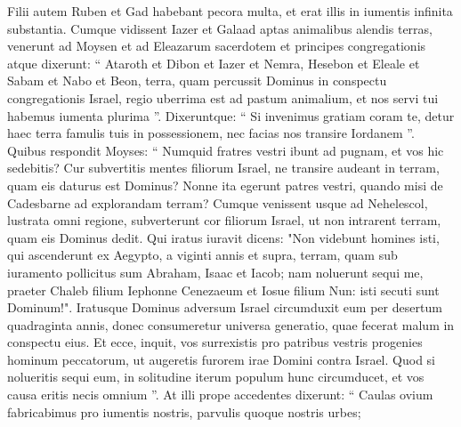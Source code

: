 \begin{biblechapter}
\begin{biblechapter}
\begin{biblechapter}
\begin{biblechapter}
\begin{biblechapter}
\begin{biblechapter}
\begin{biblechapter}
\begin{biblechapter}
\begin{biblechapter}
\begin{biblechapter}
\begin{biblechapter}
\begin{biblechapter}
\begin{biblechapter}
\begin{biblechapter}
\begin{biblechapter}
\begin{biblechapter}
\begin{biblechapter}
\begin{biblechapter}
\begin{biblechapter}
\begin{biblechapter}
\begin{biblechapter}
\begin{biblechapter}
\begin{biblechapter}
\begin{biblechapter}
\begin{biblechapter}
\begin{biblechapter}
\begin{biblechapter}
\begin{biblechapter}
\begin{biblechapter}
\begin{biblechapter}
\begin{biblechapter}
\begin{biblechapter}
\verse Filii autem Ruben et Gad habebant pecora multa, et erat illis in iumentis infinita substantia. Cumque vidissent Iazer et Galaad aptas animalibus alendis terras, 
\verse venerunt ad Moysen et ad Eleazarum sacerdotem et principes congregationis atque dixerunt: 
\verse “ Ataroth et Dibon et Iazer et Nemra, Hesebon et Eleale et Sabam et Nabo et Beon, 
\verse terra, quam percussit Dominus in conspectu congregationis Israel, regio uberrima est ad pastum animalium, et nos servi tui habemus iumenta plurima ”. 
\verse Dixeruntque: “ Si invenimus gratiam coram te, detur haec terra famulis tuis in possessionem, nec facias nos transire Iordanem ”.
 \verse Quibus respondit Moyses: “ Numquid fratres vestri ibunt ad pugnam, et vos hic sedebitis? 
\verse Cur subvertitis mentes filiorum Israel, ne transire audeant in terram, quam eis daturus est Dominus? 
\verse Nonne ita egerunt patres vestri, quando misi de Cadesbarne ad explorandam terram? 
\verse Cumque venissent usque ad Nehelescol, lustrata omni regione, subverterunt cor filiorum Israel, ut non intrarent terram, quam eis Dominus dedit. 
\verse Qui iratus iuravit dicens: 
 \verse "Non videbunt homines isti, qui ascenderunt ex Aegypto, a viginti annis et supra, terram, quam sub iuramento pollicitus sum Abraham, Isaac et Iacob; nam noluerunt sequi me, 
\verse praeter Chaleb filium Iephonne Cenezaeum et Iosue filium Nun: isti secuti sunt Dominum!". 
\verse Iratusque Dominus adversum Israel circumduxit eum per desertum quadraginta annis, donec consumeretur universa generatio, quae fecerat malum in conspectu eius. 
\verse Et ecce, inquit, vos surrexistis pro patribus vestris progenies hominum peccatorum, ut augeretis furorem irae Domini contra Israel. 
\verse Quod si nolueritis sequi eum, in solitudine iterum populum hunc circumducet, et vos causa eritis necis omnium ”.
 \verse At illi prope accedentes dixerunt: “ Caulas ovium fabricabimus pro iumentis nostris, parvulis quoque nostris urbes; 

\end{biblechapter}
\end{biblechapter}
\end{biblechapter}
\end{biblechapter}
\end{biblechapter}
\end{biblechapter}
\end{biblechapter}
\end{biblechapter}
\end{biblechapter}
\end{biblechapter}
\end{biblechapter}
\end{biblechapter}
\end{biblechapter}
\end{biblechapter}
\end{biblechapter}
\end{biblechapter}
\end{biblechapter}
\end{biblechapter}
\end{biblechapter}
\end{biblechapter}
\end{biblechapter}
\end{biblechapter}
\end{biblechapter}
\end{biblechapter}
\end{biblechapter}
\end{biblechapter}
\end{biblechapter}
\end{biblechapter}
\end{biblechapter}
\end{biblechapter}
\end{biblechapter}
\end{biblechapter}
